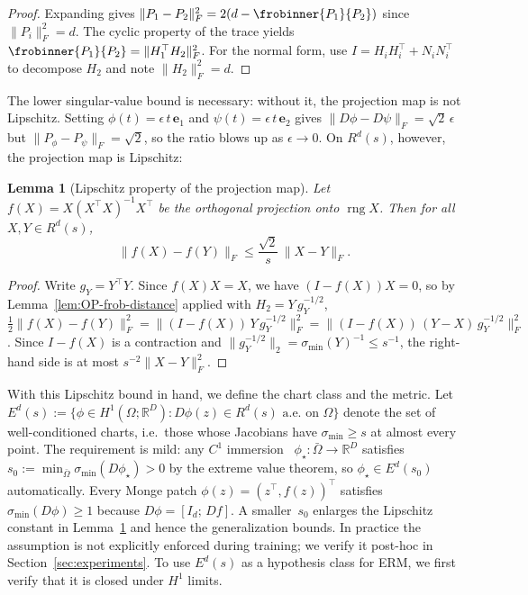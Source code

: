 \documentclass[11pt]{article}
\newcommand{\R}{\mathbb{R}}
\newcommand{\Om}{\Omega}
\newcommand{\RD}{\mathbb{R}^D}
\newcommand{\rng}{\operatorname{rng}}
\newcommand{\norm}[1]{\lVert#1\rVert}
\newcommand{\sigmin}{\sigma_{\min}}
\newtheorem{lem}[thm]{Lemma}
\begin{document}
\begin{proof}
  Expanding gives
  $\norm{P_1-P_2}_F^2
  = 2(d - \frobinner{P_1}{P_2})$
  since $\norm{P_i}_F^2=d$.
  The cyclic property of the trace yields
  $\frobinner{P_1}{P_2}=\norm{H_1^\top H_2}_F^2$.
  For the normal form, use
  $I=H_iH_i^\top+N_iN_i^\top$ to decompose $H_2$ and
  note $\norm{H_2}_F^2=d$.
\end{proof}

The lower singular-value bound is necessary: without
it, the projection map is not Lipschitz.
Setting $\phi(t)=\epsilon\,t\,\bm{e}_1$ and
$\psi(t)=\epsilon\,t\,\bm{e}_2$ gives
$\norm{D\phi-D\psi}_F=\sqrt{2}\,\epsilon$ but
$\norm{P_\phi-P_\psi}_F=\sqrt{2}$, so the ratio
blows up as $\epsilon\to 0$.
On $R^d(s)$, however, the projection map is Lipschitz:

\begin{lem}[Lipschitz property of the projection map]\label{lem:OP-lipschitz}
  Let $f(X) = X(X^\top X)^{-1}X^\top$ be the orthogonal projection onto
  $\rng X$.
  Then for all $X,Y\in R^d(s)$,
  \[
    \norm{f(X)-f(Y)}_F
    \le \frac{\sqrt{2}}{s}\,\norm{X-Y}_F.
  \]
\end{lem}

\begin{proof}
  Write $g_Y=Y^\top Y$.
  Since $f(X)X=X$, we have $(I-f(X))X=0$, so by
  Lemma~\ref{lem:OP-frob-distance} applied with
  $H_2=Y\,g_Y^{-1/2}$,
  $\tfrac{1}{2}\norm{f(X)-f(Y)}_F^2
  = \norm{(I-f(X))\,Y\,g_Y^{-1/2}}_F^2
  = \norm{(I-f(X))\,(Y-X)\,g_Y^{-1/2}}_F^2$.
  Since $I-f(X)$ is a contraction and
  $\norm{g_Y^{-1/2}}_2=\sigmin(Y)^{-1}\le s^{-1}$,
  the right-hand side is at most
  $s^{-2}\norm{X-Y}_F^2$.
\end{proof}

With this Lipschitz bound in hand, we define the chart class and the
metric.
Let
$E^d(s):=\{\phi\in H^1(\Om;\R^D):D\phi(z)\in R^d(s)
\text{ a.e.\ on } \Om\}$
denote the set of well-conditioned charts, i.e.\ those whose Jacobians have
$\sigmin\ge s$ at almost every point.
The requirement is mild: any $C^1$
immersion~\cite{lee2012smooth}
$\phi_\star:\bar\Om\to\RD$ satisfies
$s_0:=\min_{\bar\Om}\sigmin(D\phi_\star)>0$ by the extreme value
theorem, so $\phi_\star\in E^d(s_0)$ automatically.
Every Monge patch
$\phi(z)=(z^\top,f(z))^\top$ satisfies $\sigmin(D\phi)\ge 1$
because $D\phi=[I_d;\,Df]$.
A smaller~$s_0$ enlarges the Lipschitz constant in
Lemma~\ref{lem:OP-lipschitz} and hence the generalization bounds.
In practice the assumption is not explicitly enforced during
training; we verify it post-hoc in
Section~\ref{sec:experiments}.
To use $E^d(s)$ as a hypothesis class for ERM, we first verify
that it is closed under $H^1$ limits.
\end{document}
